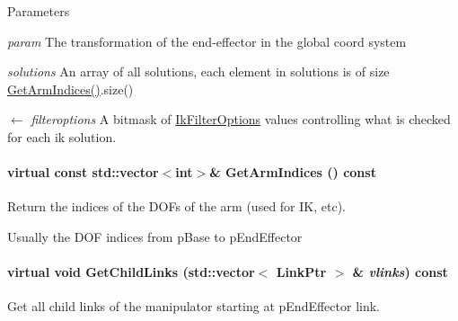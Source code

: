\begin{DoxyParams}{Parameters}
\item[{\em param}]The transformation of the end-\/effector in the global coord system \item[{\em solutions}]An array of all solutions, each element in solutions is of size \hyperlink{classOpenRAVE_1_1RobotBase_1_1Manipulator_ade23a90fcb4102d98f20dddad76ded75}{GetArmIndices()}.size() \item[\mbox{$\leftarrow$} {\em filteroptions}]A bitmask of \hyperlink{namespaceOpenRAVE_a89401ff7c557d6d1ede96b550fb22bdc}{IkFilterOptions} values controlling what is checked for each ik solution. \end{DoxyParams}
\hypertarget{classOpenRAVE_1_1RobotBase_1_1Manipulator_ade23a90fcb4102d98f20dddad76ded75}{
\paragraph[{GetArmIndices}]{\setlength{\rightskip}{0pt plus 5cm}virtual const std::vector$<$int$>$\& GetArmIndices () const}\hfill}
\label{classOpenRAVE_1_1RobotBase_1_1Manipulator_ade23a90fcb4102d98f20dddad76ded75}


Return the indices of the DOFs of the arm (used for IK, etc). 

Usually the DOF indices from pBase to pEndEffector \hypertarget{classOpenRAVE_1_1RobotBase_1_1Manipulator_a235e6b3b9b27422cdf11846a71f5ca66}{
\paragraph[{GetChildLinks}]{\setlength{\rightskip}{0pt plus 5cm}virtual void GetChildLinks (std::vector$<$ LinkPtr $>$ \& {\em vlinks}) const}\hfill}
\label{classOpenRAVE_1_1RobotBase_1_1Manipulator_a235e6b3b9b27422cdf11846a71f5ca66}


Get all child links of the manipulator starting at pEndEffector link. 

